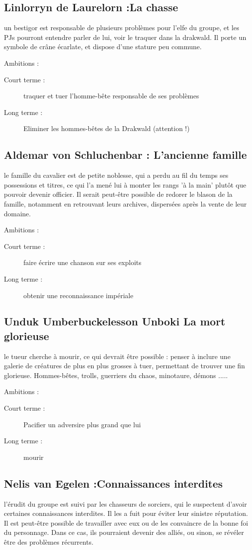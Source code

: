 \documentclass[10pt,a4paper]{book}
\begin{document}
\subsection{Linlorryn de Laurelorn :La chasse}
un bestigor est responsable de plusieurs problèmes pour l'elfe du groupe, et les PJs pourront entendre parler de lui, voir le traquer dans la drakwald.
Il porte un symbole de crâne écarlate, et dispose d'une stature peu commune.

Ambitions :
\begin{description}
\item[Court terme :]traquer et tuer l'homme-bête responsable de ses problèmes
\item[Long terme :]Eliminer les hommes-bêtes de la Drakwald (attention !)
\end{description}
\subsection{Aldemar von Schluchenbar : L'ancienne famille}
le famille du cavalier est de petite noblesse, qui a perdu au fil du temps ses possessions et titres, ce qui l'a mené lui à monter les rangs 'à la main' plutôt que pouvoir devenir officier. Il serait peut-être possible de redorer le blason de la famille, notamment en retrouvant leurs archives, dispersées après la vente de leur domaine.

Ambitions :
\begin{description}
\item[Court terme :]faire écrire une chanson sur ses exploits
\item[Long terme :]obtenir une reconnaissance impériale
\end{description}
\subsection{Unduk Umberbuckelesson Unboki La mort glorieuse}
le tueur cherche à mourir, ce qui devrait être possible : penser à inclure une galerie de créatures de plus en plus grosses à tuer, permettant de trouver une fin glorieuse. Hommes-bêtes, trolls, guerriers du chaos, minotaure, démons .....

Ambitions :
\begin{description}
\item[Court terme :]Pacifier un adversire plus grand que lui
\item[Long terme :]mourir
\end{description}
\subsection{Nelis van Egelen :Connaissances interdites}
l'érudit du groupe est suivi par les chasseurs de sorciers, qui le suspectent d'avoir certaines connaissances interdites. Il les a fuit pour éviter leur sinistre réputation. Il est peut-être possible de travailler avec eux ou de les convaincre de la bonne foi du personnage. Dans ce cas, ils pourraient devenir des alliés, ou sinon, se révéler être des problèmes récurrents.
\end{document}

